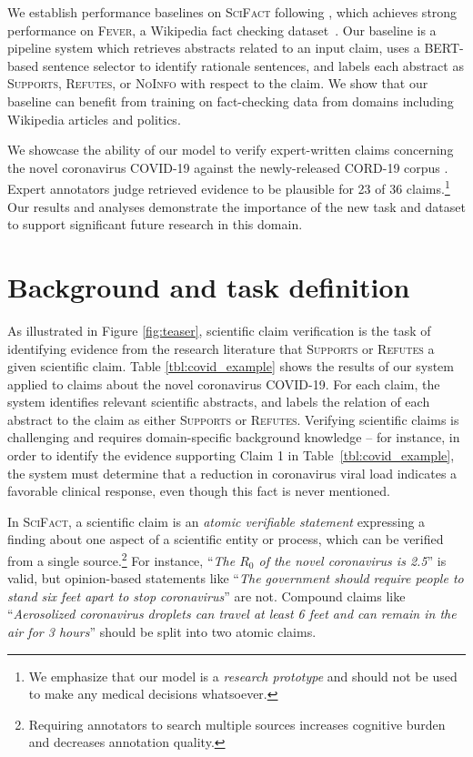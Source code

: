 \documentclass[11pt,a4paper]{article}
\newcommand{\ours}{\textsc{SciFact}\xspace}
\newcommand{\fever}{\textsc{Fever}\xspace}
\newcommand{\supports}{\textsc{Supports}\xspace}
\newcommand{\refutes}{\textsc{Refutes}\xspace}
\newcommand{\notenough}{\textsc{NoInfo}\xspace}
\newcommand{\bert}{\textsc{BERT}\xspace}
\begin{document}
We establish performance baselines on \ours following \cite{DeYoung2019ERASERAB}, which achieves strong performance on \fever, a Wikipedia fact checking dataset~\cite{Thorne2018FEVERAL}. Our baseline is a pipeline system which retrieves abstracts related to an input claim, uses a \bert-based \cite{Devlin2019BERTPO} sentence selector to identify rationale sentences, and labels each abstract as \supports, \refutes, or \notenough with respect to the claim. We show that our baseline can benefit from training on fact-checking data from domains including Wikipedia articles and politics.  



We showcase the ability of our model to verify expert-written claims concerning the novel coronavirus COVID-19 against the newly-released CORD-19 corpus \cite{Wang2020CORD19TC}. Expert annotators judge retrieved evidence to be plausible for 23 of 36 claims.\footnote{We emphasize that our model is a \emph{research prototype} and should not be used to make any medical decisions whatsoever.} Our results and analyses demonstrate the importance of the new task and dataset to support significant future research in this domain.
%
 \section{Background and task definition}

As illustrated in Figure \ref{fig:teaser}, scientific claim verification  is the task of identifying evidence from the research literature that \supports or \refutes a given scientific claim. Table \ref{tbl:covid_example} shows the results of our system  applied to claims about the novel coronavirus COVID-19. For each claim, the system identifies relevant scientific abstracts, and labels the relation of each abstract to the claim as either \supports or \refutes. Verifying scientific claims is challenging and requires domain-specific background knowledge -- for instance, in order to identify the evidence supporting Claim 1 in  Table~\ref{tbl:covid_example}, the system must determine that a reduction in coronavirus viral load indicates a favorable clinical response, even though this fact is never mentioned. 

\vspace{.2cm}
 \label{sec:claims} In \ours, a scientific claim is an \emph{atomic verifiable statement} expressing a finding about one aspect of a scientific entity or process, which can be verified from a single source.\footnote{Requiring annotators to search multiple sources increases cognitive burden and decreases annotation quality.}
For instance,  ``\emph{The $R_0$ of the novel coronavirus is 2.5}'' is valid, but opinion-based statements like ``\emph{The government should require people to stand six feet apart to stop coronavirus}'' are not. Compound claims like ``\emph{Aerosolized coronavirus droplets can travel at least 6 feet and can remain in the air for 3 hours}'' should be split into two atomic claims. 
\end{document}
